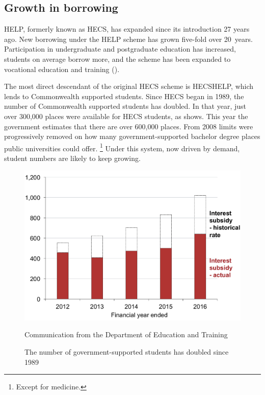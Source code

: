\documentclass{grattan}
\begin{document}
\subsection{Growth in borrowing}\label{subsec:growth-in-borrowing} 

\gls{HELP}, formerly known as \gls{HECS}, has expanded since its introduction 27 years ago.
New borrowing under the \gls{HELP} scheme has grown five-fold over 20~years. Participation in undergraduate and postgraduate education has increased, students on average borrow more, and the scheme has been expanded to vocational education and training ().

The most direct descendant of the original \gls{HECS} scheme is \gls{HECSHELP}, which lends to \gls{Commonwealth supported} students.
Since \gls{HECS} began in 1989, the number of \gls{Commonwealth supported} students has doubled.
In that year, just over 300,000 places were available for \gls{HECS} students, as  shows.
This year the government estimates that there are over 600,000 places.
From 2008 limits were progressively removed on how many government-supported bachelor degree places public universities could offer.%
   \footnote{Except for medicine.} 
Under this system, now driven by demand, student numbers are likely to keep growing.

\begin{figure}
\caption{The number of government-supported students has doubled since 1989}\label{fig:fig3-number-govt-supported-students-doubled-since-1989}

\includegraphics[page=3]{atlas/Chartpack.pdf}

%
{Communication from the Department of Education and Training}

\end{figure}
\end{document}
